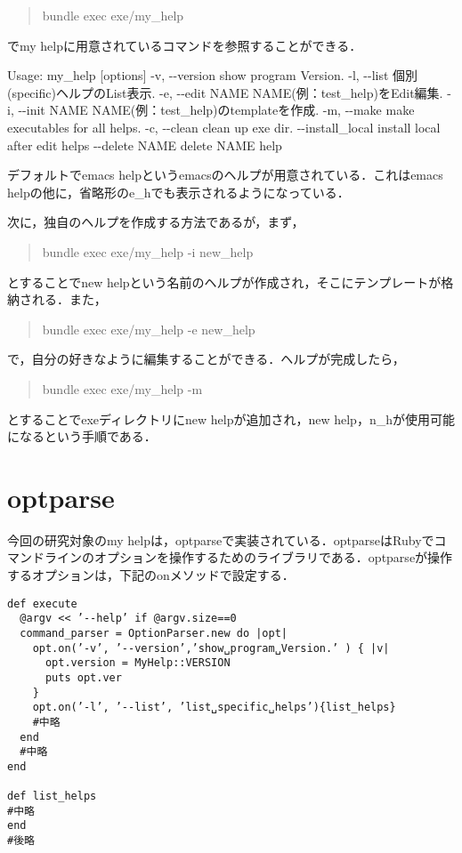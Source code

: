 \begin{quote}
bundle exec exe/my\_help
\end{quote}
でmy helpに用意されているコマンドを参照することができる．

Usage: my\_help {[}options{]} -v, -\/-version show program Version. -l,
-\/-list 個別(specific)ヘルプのList表示. -e, -\/-edit NAME
NAME(例：test\_help)をEdit編集. -i, -\/-init NAME
NAME(例：test\_help)のtemplateを作成. -m, -\/-make make executables for
all helps. -c, -\/-clean clean up exe dir. -\/-install\_local install
local after edit helps -\/-delete NAME delete NAME help

デフォルトでemacs helpというemacsのヘルプが用意されている．これはemacs
helpの他に，省略形のe\_hでも表示されるようになっている．

次に，独自のヘルプを作成する方法であるが，まず，

\begin{quote}
bundle exec exe/my\_help -i new\_help
\end{quote}
とすることでnew
helpという名前のヘルプが作成され，そこにテンプレートが格納される．また，

\begin{quote}
bundle exec exe/my\_help -e new\_help
\end{quote}
で，自分の好きなように編集することができる．ヘルプが完成したら，

\begin{quote}
bundle exec exe/my\_help -m
\end{quote}
とすることでexeディレクトリにnew helpが追加され，new
help，n\_hが使用可能になるという手順である．

\section{optparse}\label{optparse}

今回の研究対象のmy
helpは，optparseで実装されている．optparseはRubyでコマンドラインのオプションを操作するためのライブラリである．optparseが操作するオプションは，下記のonメソッドで設定する．

\begin{verbatim}
def execute
  @argv << ’--help’ if @argv.size==0
  command_parser = OptionParser.new do |opt|
    opt.on(’-v’, ’--version’,’show␣program␣Version.’ ) { |v|
      opt.version = MyHelp::VERSION
      puts opt.ver
    }
    opt.on(’-l’, ’--list’, ’list␣specific␣helps’){list_helps}
    #中略
  end
  #中略
end
    
def list_helps
#中略
end
#後略
\end{verbatim}

